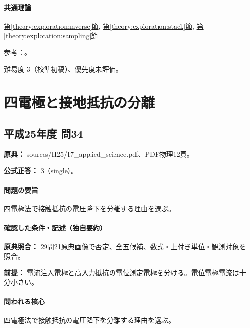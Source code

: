 \paragraph{共通理論} \hyperref[theory:exploration:inverse]{第\ref*{theory:exploration:inverse}節}, \hyperref[theory:exploration:stack]{第\ref*{theory:exploration:stack}節}, \hyperref[theory:exploration:sampling]{第\ref*{theory:exploration:sampling}節}

\par 参考：\cite{mit_signals2010,mit_moving2012,scipy_notch,scipy_fft,usgs_processing2000,pygimli_inversion}。

\par 難易度 3（校準初稿）、優先度未評価。

\section{四電極と接地抵抗の分離}

\subsection{平成25年度 問34}
\label{q:h25-reg-applied-34}

\noindent\textbf{原典：} sources/H25/17\_applied\_science.pdf、PDF物理12頁。

\textbf{公式正答：} 3（single）。

\paragraph{問題の要旨} 四電極法で接触抵抗の電圧降下を分離する理由を選ぶ。

\paragraph{確認した条件・記述（独自要約）}\mbox{}\par

\noindent\textbf{原典照合：} 29問21原典画像で否定、全五候補、数式・上付き単位・観測対象を照合。\par

\noindent\textbf{前提：} 電流注入電極と高入力抵抗の電位測定電極を分ける。電位電極電流は十分小さい。\par

\paragraph{問われる核心} 四電極法で接触抵抗の電圧降下を分離する理由を選ぶ。

